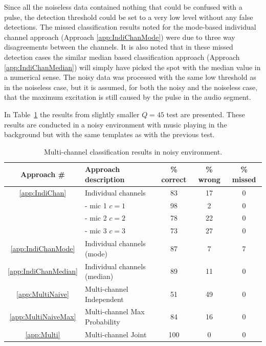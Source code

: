 \DIFaddend Since all the noiseless data contained nothing that could be confused with a pulse, the detection threshold could be set to a very low level without any false detections. The missed classification results noted for the mode-based individual channel approach (Approach \ref{app:IndiChanMode}) were due to three way disagreements between the channels. It is also noted that in these missed detection cases the similar median based classification approach (Approach \ref{app:IndiChanMedian}) will simply have picked the spot with the median value in a numerical sense. The noisy data was processed with the same low threshold as in the noiseless case, but it is assumed, for both the noisy and the noiseless case, that the maximum excitation is still caused by the pulse in the audio segment.

In Table~\ref{tab:multiAPRresultsNoise} the results from \DIFdelbegin {}\DIFdelend \DIFaddbegin {}\DIFaddend slightly smaller $Q=45$ test \DIFaddbegin {}\DIFaddend are presented. These results are conducted in a noisy environment with music playing in the background but with the same templates as with the previous test.

\begin{table}\begin{center}
\caption{Multi-channel classification results in noisy environment.}
\label{tab:multiAPRresultsNoise}
\begin{tabular}{|c|l|c|c|c|}\hline
Approach \#             & Approach description          & \% correct    & \% wrong  & \%  missed  \\ \hline
\ref{app:IndiChan}      & Individual channels           & 83            & 17        & 0           \\
                        &  - mic 1 $c = 1$              & 98            & 2         & 0           \\
                        &  - mic 2 $c = 2$              & 78            & 22        & 0           \\
                        &  - mic 3 $c = 3$              & 73            & 27        & 0           \\
\ref{app:IndiChanMode}  & Individual channels (mode)    & 87            & 7         & 7           \\
\ref{app:IndiChanMedian}& Individual channels (median)  & 89            & 11        & 0           \\
\ref{app:MultiNaive}    & Multi-channel Independent     & 51            & 49        & 0           \\
\ref{app:MultiNaiveMax} & Multi-channel Max Probability & 84            & 16        & 0           \\
\ref{app:Multi}         & Multi-channel Joint           & 100           & 0         & 0           \\ \hline
\end{tabular}\end{center}\end{table}

